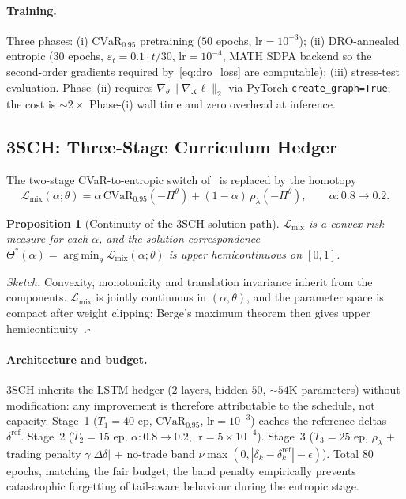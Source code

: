 \documentclass[11pt]{article}
\newcommand{\cvar}{\mathrm{CVaR}}
\newcommand{\argmin}{\mathop{\mathrm{arg\,min}}}
\newtheorem{proposition}{Proposition}
\begin{document}
\paragraph{Training.}  Three phases: (i) $\cvar_{0.95}$ pretraining ($50$ epochs, $\mathrm{lr}=10^{-3}$); (ii) DRO-annealed entropic ($30$ epochs, $\varepsilon_t = 0.1\cdot t/30$, $\mathrm{lr}=10^{-4}$, MATH SDPA backend so the second-order gradients required by~\eqref{eq:dro_loss} are computable); (iii) stress-test evaluation.  Phase~(ii) requires $\nabla_\theta\|\nabla_X\ell\|_2$ via PyTorch \texttt{create\_graph=True}; the cost is $\sim 2\times$ Phase-(i) wall time and zero overhead at inference.

\subsection{3SCH: Three-Stage Curriculum Hedger}\label{sec:3sch}

The two-stage CVaR-to-entropic switch of~\citet{kozyra2019deep} is replaced by the homotopy
\begin{equation}
\mathcal{L}_{\mathrm{mix}}(\alpha;\theta) = \alpha\,\cvar_{0.95}(-\Pi^\theta) + (1-\alpha)\,\rho_\lambda(-\Pi^\theta),
\qquad
\alpha:0.8\to 0.2.
\label{eq:homotopy}
\end{equation}

\begin{proposition}[Continuity of the 3SCH solution path]
$\mathcal{L}_{\mathrm{mix}}$ is a convex risk measure for each $\alpha$, and the solution correspondence $\Theta^*(\alpha)=\argmin_\theta\mathcal{L}_{\mathrm{mix}}(\alpha;\theta)$ is upper hemicontinuous on $[0,1]$.
\end{proposition}

\noindent\textit{Sketch.}  Convexity, monotonicity and translation invariance inherit from the components.  $\mathcal{L}_{\mathrm{mix}}$ is jointly continuous in $(\alpha,\theta)$, and the parameter space is compact after weight clipping; Berge's maximum theorem then gives upper hemicontinuity~\citep{aliprantis2006infinite}.\hfill$\square$

\paragraph{Architecture and budget.}  3SCH inherits the LSTM hedger ($2$ layers, hidden $50$, $\sim 54$K parameters) without modification: any improvement is therefore attributable to the schedule, not capacity.  Stage~1 ($T_1=40$ ep, $\cvar_{0.95}$, $\mathrm{lr}=10^{-3}$) caches the reference deltas $\delta^{\mathrm{ref}}$.  Stage~2 ($T_2=15$ ep, $\alpha:0.8\to 0.2$, $\mathrm{lr}=5\times 10^{-4}$).  Stage~3 ($T_3=25$ ep, $\rho_\lambda$ + trading penalty $\gamma|\Delta\delta|$ + no-trade band $\nu\max(0, |\delta_k-\delta_k^{\mathrm{ref}}|-\epsilon)$).  Total $80$ epochs, matching the fair budget; the band penalty empirically prevents catastrophic forgetting of tail-aware behaviour during the entropic stage.
\end{document}
